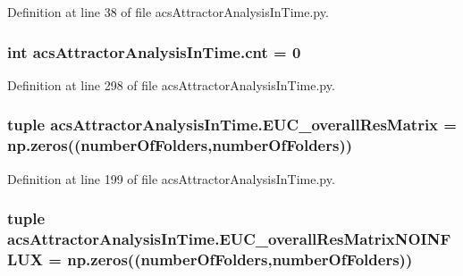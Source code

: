 Definition at line 38 of file acs\+Attractor\+Analysis\+In\+Time.\+py.

\hypertarget{a00125_aabada0bdbcd7fb71d37a9310d32f0a28}{
\subsubsection[{cnt}]{\setlength{\rightskip}{0pt plus 5cm}int acs\+Attractor\+Analysis\+In\+Time.\+cnt = 0}}\label{a00125_aabada0bdbcd7fb71d37a9310d32f0a28}


Definition at line 298 of file acs\+Attractor\+Analysis\+In\+Time.\+py.

\hypertarget{a00125_a63ee1925f76a40d04495e9b35c0973d2}{
\subsubsection[{E\+U\+C\+\_\+overall\+Res\+Matrix}]{\setlength{\rightskip}{0pt plus 5cm}tuple acs\+Attractor\+Analysis\+In\+Time.\+E\+U\+C\+\_\+overall\+Res\+Matrix = np.\+zeros(({\bf number\+Of\+Folders},{\bf number\+Of\+Folders}))}}\label{a00125_a63ee1925f76a40d04495e9b35c0973d2}


Definition at line 199 of file acs\+Attractor\+Analysis\+In\+Time.\+py.

\hypertarget{a00125_a4f2ecc559d2c5d79bb138a2e8ced8127}{
\subsubsection[{E\+U\+C\+\_\+overall\+Res\+Matrix\+N\+O\+I\+N\+F\+L\+U\+X}]{\setlength{\rightskip}{0pt plus 5cm}tuple acs\+Attractor\+Analysis\+In\+Time.\+E\+U\+C\+\_\+overall\+Res\+Matrix\+N\+O\+I\+N\+F\+L\+U\+X = np.\+zeros(({\bf number\+Of\+Folders},{\bf number\+Of\+Folders}))}}\label{a00125_a4f2ecc559d2c5d79bb138a2e8ced8127}


